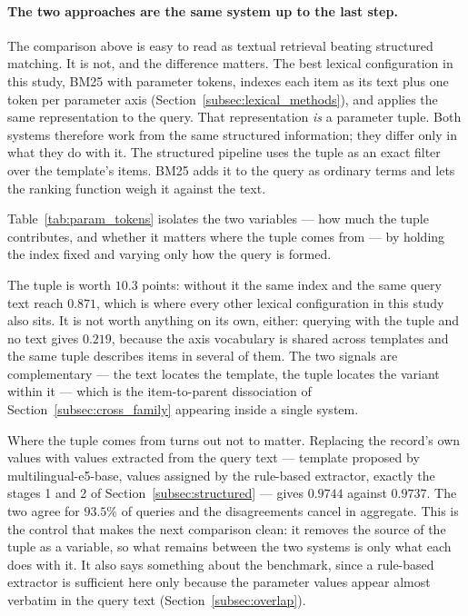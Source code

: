 \documentclass[preprint,review,12pt]{elsarticle}
\begin{document}
\paragraph{The two approaches are the same system up to the last step.}
The comparison above is easy to read as textual retrieval beating structured matching. It is not, and the difference matters. The best lexical configuration in this study, BM25 with parameter tokens, indexes each item as its text plus one token per parameter axis (Section~\ref{subsec:lexical_methods}), and applies the same representation to the query. That representation \emph{is} a parameter tuple. Both systems therefore work from the same structured information; they differ only in what they do with it. The structured pipeline uses the tuple as an exact filter over the template's items. BM25 adds it to the query as ordinary terms and lets the ranking function weigh it against the text.

Table~\ref{tab:param_tokens} isolates the two variables --- how much the tuple contributes, and whether it matters where the tuple comes from --- by holding the index fixed and varying only how the query is formed.



The tuple is worth $10.3$ points: without it the same index and the same query text reach $0.871$, which is where every other lexical configuration in this study also sits. It is not worth anything on its own, either: querying with the tuple and no text gives $0.219$, because the axis vocabulary is shared across templates and the same tuple describes items in several of them. The two signals are complementary --- the text locates the template, the tuple locates the variant within it --- which is the item-to-parent dissociation of Section~\ref{subsec:cross_family} appearing inside a single system.

Where the tuple comes from turns out not to matter. Replacing the record's own values with values extracted from the query text --- template proposed by multilingual-e5-base, values assigned by the rule-based extractor, exactly the stages 1 and 2 of Section~\ref{subsec:structured} --- gives $0.9744$ against $0.9737$. The two agree for $93.5\%$ of queries and the disagreements cancel in aggregate. This is the control that makes the next comparison clean: it removes the source of the tuple as a variable, so what remains between the two systems is only what each does with it. It also says something about the benchmark, since a rule-based extractor is sufficient here only because the parameter values appear almost verbatim in the query text (Section~\ref{subsec:overlap}).
\end{document}
